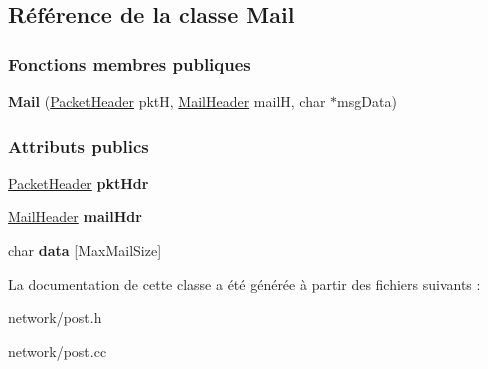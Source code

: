 \hypertarget{class_mail}{}\subsection{Référence de la classe Mail}
\label{class_mail}
\subsubsection*{Fonctions membres publiques}
\begin{DoxyCompactItemize}
\item 
\hypertarget{class_mail_a25507f11e0e61e0bc84b6667650a9090}{}\label{class_mail_a25507f11e0e61e0bc84b6667650a9090} 
{\bfseries Mail} (\hyperlink{class_packet_header}{Packet\+Header} pktH, \hyperlink{class_mail_header}{Mail\+Header} mailH, char $\ast$msg\+Data)
\end{DoxyCompactItemize}
\subsubsection*{Attributs publics}
\begin{DoxyCompactItemize}
\item 
\hypertarget{class_mail_a7309e530849e6c8344975eaba744af5f}{}\label{class_mail_a7309e530849e6c8344975eaba744af5f} 
\hyperlink{class_packet_header}{Packet\+Header} {\bfseries pkt\+Hdr}
\item 
\hypertarget{class_mail_a1409880dfb35487ddb6d7373a4322281}{}\label{class_mail_a1409880dfb35487ddb6d7373a4322281} 
\hyperlink{class_mail_header}{Mail\+Header} {\bfseries mail\+Hdr}
\item 
\hypertarget{class_mail_a6c05d7e6f61ab0c8e085690923ee7e93}{}\label{class_mail_a6c05d7e6f61ab0c8e085690923ee7e93} 
char {\bfseries data} \mbox{[}Max\+Mail\+Size\mbox{]}
\end{DoxyCompactItemize}


La documentation de cette classe a été générée à partir des fichiers suivants \+:\begin{DoxyCompactItemize}
\item 
network/post.\+h\item 
network/post.\+cc\end{DoxyCompactItemize}
